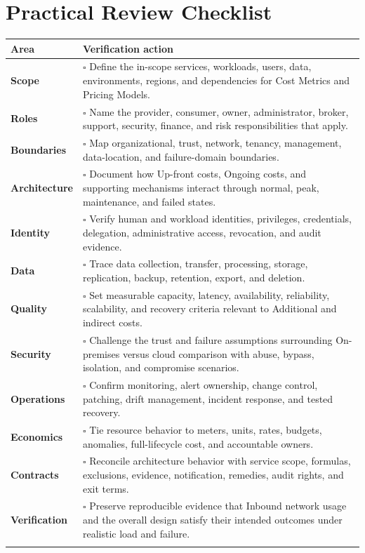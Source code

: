 \documentclass[11pt]{article}
\begin{document}
\section{Practical Review Checklist}
\begin{longtable}{@{}>{\bfseries\color{Teal}}p{}>{\RaggedRight\arraybackslash}p{}@{}}
\toprule\textbf{Area} & \textbf{Verification action}\\\midrule\endhead
Scope & $\square$ Define the in-scope services, workloads, users, data, environments, regions, and dependencies for Cost Metrics and Pricing Models. \\\addlinespace[2pt]
Roles & $\square$ Name the provider, consumer, owner, administrator, broker, support, security, finance, and risk responsibilities that apply. \\\addlinespace[2pt]
Boundaries & $\square$ Map organizational, trust, network, tenancy, management, data-location, and failure-domain boundaries. \\\addlinespace[2pt]
Architecture & $\square$ Document how Up-front costs, Ongoing costs, and supporting mechanisms interact through normal, peak, maintenance, and failed states. \\\addlinespace[2pt]
Identity & $\square$ Verify human and workload identities, privileges, credentials, delegation, administrative access, revocation, and audit evidence. \\\addlinespace[2pt]
Data & $\square$ Trace data collection, transfer, processing, storage, replication, backup, retention, export, and deletion. \\\addlinespace[2pt]
Quality & $\square$ Set measurable capacity, latency, availability, reliability, scalability, and recovery criteria relevant to Additional and indirect costs. \\\addlinespace[2pt]
Security & $\square$ Challenge the trust and failure assumptions surrounding On-premises versus cloud comparison with abuse, bypass, isolation, and compromise scenarios. \\\addlinespace[2pt]
Operations & $\square$ Confirm monitoring, alert ownership, change control, patching, drift management, incident response, and tested recovery. \\\addlinespace[2pt]
Economics & $\square$ Tie resource behavior to meters, units, rates, budgets, anomalies, full-lifecycle cost, and accountable owners. \\\addlinespace[2pt]
Contracts & $\square$ Reconcile architecture behavior with service scope, formulas, exclusions, evidence, notification, remedies, audit rights, and exit terms. \\\addlinespace[2pt]
Verification & $\square$ Preserve reproducible evidence that Inbound network usage and the overall design satisfy their intended outcomes under realistic load and failure. \\\addlinespace[2pt]
\bottomrule
\end{longtable}
\end{document}

